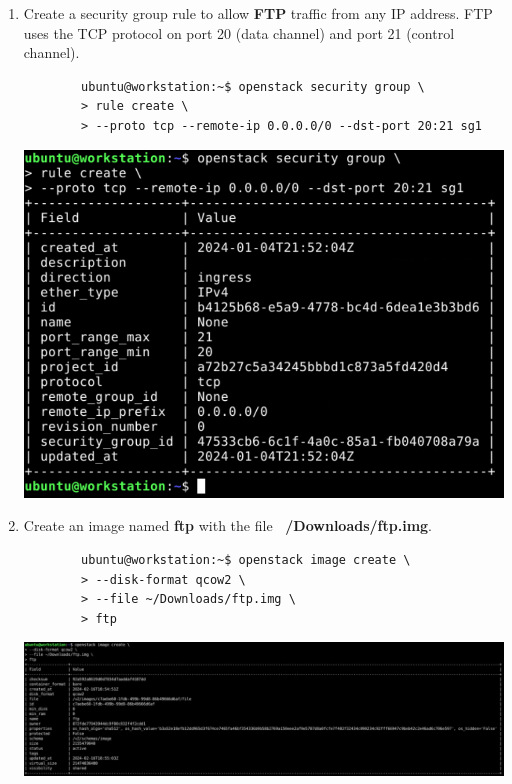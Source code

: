 \documentclass[letterpaper, 12pt]{article}
\begin{document}
\begin{enumerate}
    \item Create a security group rule to allow \textbf{FTP} traffic from any IP address. FTP uses the TCP protocol on
    port 20 (data channel) and port 21 (control channel).
    \begin{lstlisting}
        ubuntu@workstation:~$ openstack security group \
        > rule create \
        > --proto tcp --remote-ip 0.0.0.0/0 --dst-port 20:21 sg1
    \end{lstlisting}

    \begin{center}
        \includegraphics[width=\linewidth]{images/part1/step32.png}
    \end{center}

    \item Create an image named \textbf{ftp} with the file \textbf{~/Downloads/ftp.img}.
    \begin{lstlisting}
        ubuntu@workstation:~$ openstack image create \
        > --disk-format qcow2 \
        > --file ~/Downloads/ftp.img \
        > ftp
    \end{lstlisting}

    \begin{center}
        \includegraphics[width=\linewidth]{images/part1/step33.png}
    \end{center}


\end{enumerate}
\end{document}
